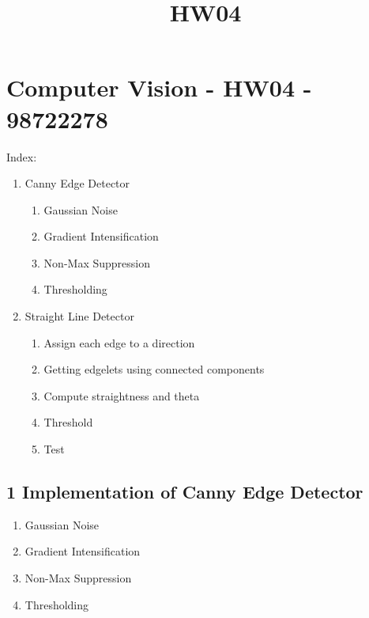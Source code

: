 \documentclass[11pt]{article}
\title{HW04}
\providecommand{\tightlist}{%
      \setlength{\itemsep}{0pt}\setlength{\parskip}{0pt}}
\begin{document}
    
    
    \maketitle
    
    

    
    \hypertarget{computer-vision---hw04---98722278}{%
\section{Computer Vision - HW04 -
98722278}\label{computer-vision---hw04---98722278}}

Index:

\begin{enumerate}
\def\labelenumi{\arabic{enumi}.}
\tightlist
\item
  Canny Edge Detector

  \begin{enumerate}
  \def\labelenumii{\arabic{enumii}.}
  \tightlist
  \item
    Gaussian Noise
  \item
    Gradient Intensification
  \item
    Non-Max Suppression
  \item
    Thresholding
  \end{enumerate}
\item
  Straight Line Detector

  \begin{enumerate}
  \def\labelenumii{\arabic{enumii}.}
  \tightlist
  \item
    Assign each edge to a direction
  \item
    Getting edgelets using connected components
  \item
    Compute straightness and theta
  \item
    Threshold
  \item
    Test
  \end{enumerate}
\end{enumerate}

    \hypertarget{implementation-of-canny-edge-detector}{%
\subsection{1 Implementation of Canny Edge
Detector}\label{implementation-of-canny-edge-detector}}

\begin{enumerate}
\def\labelenumi{\arabic{enumi}.}
\tightlist
\item
  Gaussian Noise
\item
  Gradient Intensification
\item
  Non-Max Suppression
\item
  Thresholding
\end{enumerate}
\end{document}

